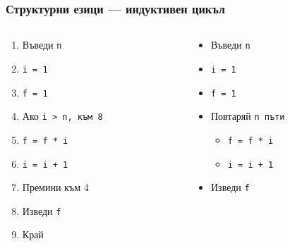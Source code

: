 \documentclass[alsotrans]{beamerswitch}
\begin{document}
\begin{frame}
  \frametitle{Структурни езици — индуктивен цикъл}

  \begin{columns}
    \begin{column}{.5\textwidth}
      \begin{enumerate}
      \item Въведи \tt n
      \item \tt{i = 1}
      \item \tt{f = 1}
      \item Ако \tt{i > n}, към 8
      \item \tt{f = f * i}
      \item \tt{i = i + 1}
      \item Премини към 4
      \item Изведи \tt f
      \item Край
      \end{enumerate}
    \end{column}
    \begin{column}{.5\textwidth}
      \begin{itemize}
      \item Въведи \tt n
      \item \tt{i = 1}
      \item \tt{f = 1}
      \item Повтаряй \tt n пъти
        \begin{itemize}
        \item \tt{f = f * i}
        \item \tt{i = i + 1}
        \end{itemize}
      \item Изведи \tt f
      \end{itemize}
    \end{column}
  \end{columns}
\end{frame}
\end{document}
